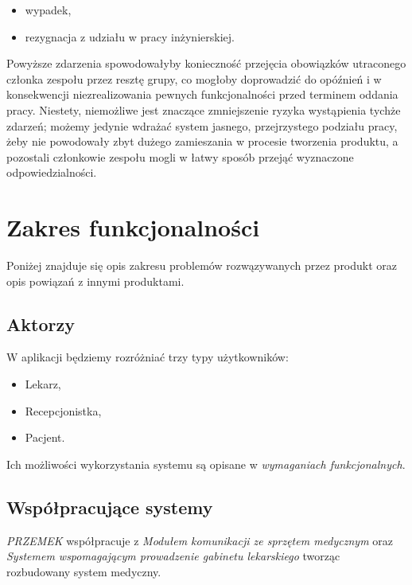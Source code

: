 \documentclass[polish,12pt]{aghthesis}
\begin{document}
\begin{itemize}
\begin{itemize}
      \item wypadek,
      \item rezygnacja z udziału w pracy inżynierskiej.
  \end{itemize}
  Powyższe zdarzenia spowodowałyby konieczność przejęcia obowiązków utraconego członka zespołu przez resztę grupy, co mogłoby doprowadzić do opóźnień i w konsekwencji niezrealizowania pewnych funkcjonalności przed terminem oddania pracy. Niestety, niemożliwe jest znaczące zmniejszenie ryzyka wystąpienia tychże zdarzeń; możemy jedynie wdrażać system jasnego, przejrzystego podziału pracy, żeby nie powodowały zbyt dużego zamieszania w procesie tworzenia produktu, a pozostali członkowie zespołu mogli w łatwy sposób przejąć wyznaczone odpowiedzialności.
\end{itemize}
\section{Zakres funkcjonalności}
\label{sec:zakres-funkcjonalnosci}

Poniżej znajduje się opis zakresu problemów rozwązywanych przez produkt oraz opis powiązań z innymi produktami.

\subsection{Aktorzy}
W aplikacji będziemy rozróżniać trzy typy użytkowników:
\begin{itemize}
    \item Lekarz,
    \item Recepcjonistka,
    \item Pacjent.
\end{itemize}
Ich możliwości wykorzystania systemu są opisane w \emph{wymaganiach funkcjonalnych}. 
    
\subsection{Współpracujące systemy}
\emph{PRZEMEK} współpracuje z \emph{Modułem komunikacji ze sprzętem medycznym} oraz \emph{Systemem wspomagającym prowadzenie gabinetu lekarskiego} tworząc rozbudowany system medyczny.

\end{document}
